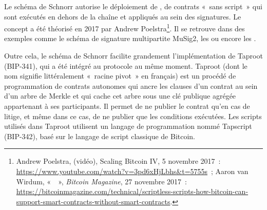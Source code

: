 Le schéma de Schnorr autorise le déploiement de , de contrats «~sans script~» qui sont exécutés en dehors de la chaîne et appliqués au sein des signatures. Le concept a été théorisé en 2017 par Andrew Poelstra\footnote{Andrew Poelstra,  (vidéo), Scaling Bitcoin IV, 5 novembre 2017~: \url{https://www.youtube.com/watch?v=3pd6xHjLbhs\&t=5755s}~; Aaron van Wirdum, «~~», \emph{Bitcoin Magazine}, 27 novembre 2017~: \url{https://bitcoinmagazine.com/technical/scriptless-scripts-how-bitcoin-can-support-smart-contracts-without-smart-contracts}.}. Il se retrouve dans des exemples comme le schéma de signature multipartite MuSig2, les  ou encore les .

Outre cela, le schéma de Schnorr facilite grandement l'implémentation de Taproot (BIP-341), qui a été intégré au protocole au même moment. Taproot (dont le nom signifie littéralement «~racine pivot~» en français) est un procédé de programmation de contrats autonomes qui ancre les clauses d'un contrat au sein d'un arbre de Merkle et qui cache cet arbre sous une clé publique agrégée appartenant à ses participants. Il permet de ne publier le contrat qu'en cas de litige, et même dans ce cas, de ne publier que les conditions exécutées. Les scripts utilisés dans Taproot utilisent un langage de programmation nommé Tapscript (BIP-342), basé sur le langage de script classique de Bitcoin.

